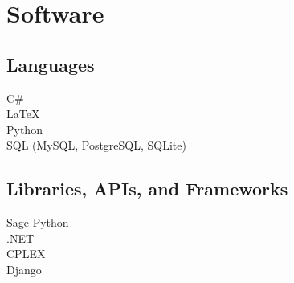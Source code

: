 \documentclass{clinton-resume} %
\begin{document}
\begin{minipage}[t]{0.33\textwidth}
\sectionspace %


\section{Software}

\subsection{Languages}

C\#\\
\LaTeX\\
Python\\
SQL (MySQL, PostgreSQL, SQLite)\\



\sectionspace %


\subsection{Libraries, APIs, and Frameworks}


Sage Python\\
.NET\\
CPLEX\\
Django\\



\end{minipage}
\end{document}
